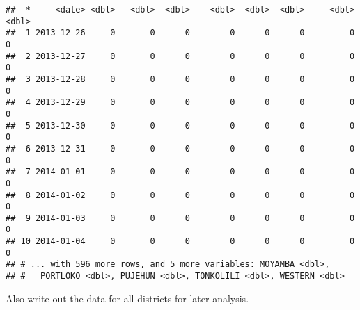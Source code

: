 \documentclass[11pt,]{article}
\begin{document}
\begin{verbatim}
##  *     <date> <dbl>   <dbl>  <dbl>    <dbl>  <dbl>  <dbl>     <dbl> <dbl>
##  1 2013-12-26     0       0      0        0      0      0         0     0
##  2 2013-12-27     0       0      0        0      0      0         0     0
##  3 2013-12-28     0       0      0        0      0      0         0     0
##  4 2013-12-29     0       0      0        0      0      0         0     0
##  5 2013-12-30     0       0      0        0      0      0         0     0
##  6 2013-12-31     0       0      0        0      0      0         0     0
##  7 2014-01-01     0       0      0        0      0      0         0     0
##  8 2014-01-02     0       0      0        0      0      0         0     0
##  9 2014-01-03     0       0      0        0      0      0         0     0
## 10 2014-01-04     0       0      0        0      0      0         0     0
## # ... with 596 more rows, and 5 more variables: MOYAMBA <dbl>,
## #   PORTLOKO <dbl>, PUJEHUN <dbl>, TONKOLILI <dbl>, WESTERN <dbl>
\end{verbatim}

Also write out the data for all districts for later analysis.
\end{document}
